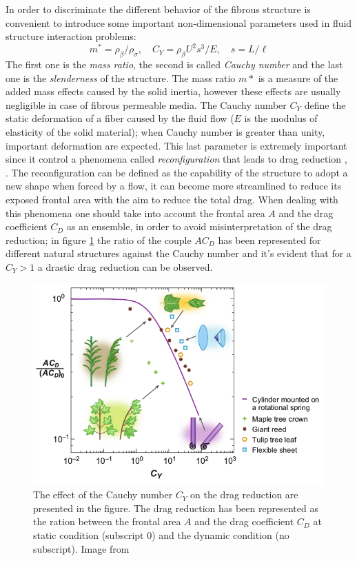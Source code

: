 In order to discriminate the different behavior of the fibrous structure is convenient to introduce some important non-dimensional parameters used in fluid structure interaction problems:
$$ m^* = \rho_{\beta} / \rho_{\sigma}, \quad C_Y= \rho_{\beta} U^2 s^3 / E, \quad s = L/\ell $$
The first one is the \textit{mass ratio}, the second is called \textit{Cauchy number} and the last one is the \textit{slenderness} of the structure.
The mass ratio $m*$ is a measure of the added mass effects caused by the solid inertia, however these effects are usually negligible in case of fibrous permeable media.
The Cauchy number $C_Y$ define the static deformation of a fiber caused by the fluid flow ($E$ is the modulus of elasticity of the solid material); when Cauchy number is greater than unity, important deformation are expected.
This last parameter is extremely important since it control a phenomena called \textit{reconfiguration} that leads to drag reduction \citet{gosselin2011drag}, \citet{alvarado2017nature}.
The reconfiguration can be defined as the capability of the structure to adopt a new shape when forced by a flow, it can become more streamlined to reduce its exposed frontal area with the aim to reduce the total drag.
When dealing with this phenomena one should take into account the frontal area $A$ and the drag coefficient $C_D$ as an ensemble, in order to avoid misinterpretation of the drag reduction; in figure \ref{fig:cycd} the ratio of the couple $AC_D$ has been represented for different natural structures against the Cauchy number and it's evident that for a $C_Y>1$ a drastic drag reduction can be observed.

\begin{figure}[h]
	\centering
	\includegraphics[width=0.7\linewidth]{chapter_1/cy_cd}
	\caption{The effect of the Cauchy number $C_Y$ on the drag reduction are presented in the figure. The drag reduction has been represented as the ration between the frontal area $A$ and the drag coefficient $C_D$ at static condition (subscript $0$) and the dynamic condition (no subscript). Image from \citet{de2008effects}}
	\label{fig:cycd}
\end{figure}

